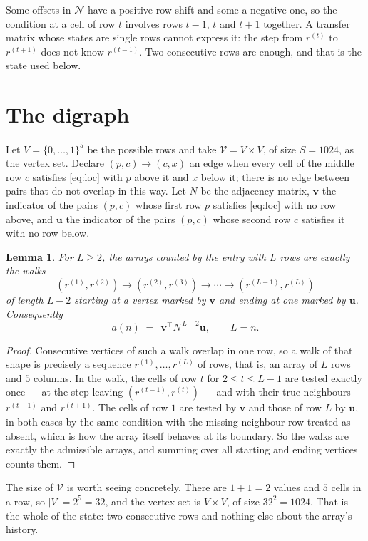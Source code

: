 \documentclass[11pt,a4paper]{article}
\theoremstyle{plain}
\newtheorem{lemma}[theorem]{Lemma}
\theoremstyle{definition}
\begin{document}
Some offsets in $\mathcal N$ have a positive row shift and some a negative one, so the
condition at a cell of row $t$ involves rows $t-1$, $t$ and $t+1$ together. A transfer
matrix whose states are single rows cannot express it: the step from $r^{(t)}$ to
$r^{(t+1)}$ does not know $r^{(t-1)}$. Two consecutive rows are enough, and that is
the state used below.

\section{The digraph}

Let $V=\{0,\dots,1\}^{5}$ be the possible rows and take
$\mathcal V=V\times V$, of size $S=1024$, as the vertex set. Declare $(p,c)\to(c,x)$ an edge
when every cell of the middle row $c$ satisfies \eqref{eq:loc} with $p$ above it and $x$
below it; there is no edge between pairs that do not overlap in this way. Let $N$ be the
adjacency matrix, $\mathbf{v}$ the indicator of the pairs $(p,c)$ whose first row $p$
satisfies \eqref{eq:loc} with no row above, and $\mathbf{u}$ the indicator of
the pairs $(p,c)$ whose second row $c$ satisfies it with no row below.

\begin{lemma}\label{lem:walk}
For $L\ge2$, the arrays counted by the entry with $L$ rows are exactly the walks
\[
(r^{(1)},r^{(2)})\to(r^{(2)},r^{(3)})\to\cdots\to(r^{(L-1)},r^{(L)})
\]
of length $L-2$ starting at a vertex marked by $\mathbf{v}$ and ending at one marked by
$\mathbf{u}$. Consequently
\[
a(n)\;=\;\,\mathbf{v}^{\!\top}N^{\,L-2}\mathbf{u},\qquad L=n .
\]
\end{lemma}

\begin{proof}
Consecutive vertices of such a walk overlap in one row, so a walk of that shape is
precisely a sequence $r^{(1)},\dots,r^{(L)}$ of rows, that is, an array of $L$ rows
and $5$ columns. In the walk, the cells of row $t$ for $2\le t\le L-1$ are tested
exactly once --- at the step leaving $(r^{(t-1)},r^{(t)})$ --- and with their true
neighbours $r^{(t-1)}$ and $r^{(t+1)}$. The cells of row $1$ are tested by
$\mathbf{v}$ and those of row $L$ by $\mathbf{u}$, in both cases by the same condition
with the missing neighbour row treated as absent, which is how the array itself behaves at
its boundary. So the walks are exactly the admissible arrays, and summing over all starting
and ending vertices counts them.
\end{proof}


The size of $\mathcal V$ is worth seeing concretely. There are $1+1=2$ values
and $5$ cells in a row, so $|V|=2^{5}=32$, and the vertex set is
$V\times V$, of size $32^2=1024$. That is the whole of the state: two consecutive
rows and nothing else about the array's history.
\end{document}
